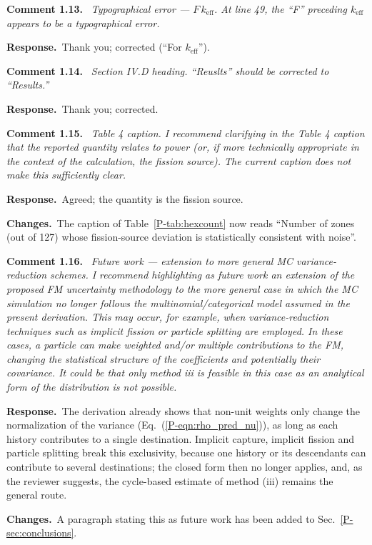 \documentclass[11pt]{article}
\newenvironment{revcomment}[1]
  {\par\medskip\noindent\textbf{Comment #1.}\ \itshape}
  {\par}
\newcommand{\response}{\par\noindent\textbf{Response.}\ }
\newcommand{\changes}{\par\noindent\textbf{Changes.}\ }
\begin{document}
\begin{revcomment}{1.13}
Typographical error --- $F\,k_{\mathrm{eff}}$. At line 49, the ``F'' preceding
$k_{\mathrm{eff}}$ appears to be a typographical error.
\end{revcomment}
\response Thank you; corrected (``For $k_{\text{eff}}$'').

\begin{revcomment}{1.14}
Section IV.D heading. ``Reuslts'' should be corrected to ``Results.''
\end{revcomment}
\response Thank you; corrected.

\begin{revcomment}{1.15}
Table 4 caption. I recommend clarifying in the Table 4 caption that the reported
quantity relates to power (or, if more technically appropriate in the context of the
calculation, the fission source). The current caption does not make this sufficiently
clear.
\end{revcomment}
\response Agreed; the quantity is the fission source.
\changes The caption of Table~\ref{P-tab:hexcount} now reads ``Number of zones (out of 127) whose fission-source deviation is statistically consistent with noise''.

\begin{revcomment}{1.16}
Future work --- extension to more general MC variance-reduction schemes. I recommend
highlighting as future work an extension of the proposed FM uncertainty methodology to
the more general case in which the MC simulation no longer follows the
multinomial/categorical model assumed in the present derivation. This may occur, for
example, when variance-reduction techniques such as implicit fission or particle
splitting are employed. In these cases, a particle can make weighted and/or multiple
contributions to the FM, changing the statistical structure of the coefficients and
potentially their covariance. It could be that only method iii is feasible in this case
as an analytical form of the distribution is not possible.
\end{revcomment}
\response The derivation already shows that non-unit weights only change the normalization of the variance (Eq.~(\ref{P-eqn:rho_pred_nu})), as long as each history contributes to a single destination. Implicit capture, implicit fission and particle splitting break this exclusivity, because one history or its descendants can contribute to several destinations; the closed form then no longer applies, and, as the reviewer suggests, the cycle-based estimate of method (iii) remains the general route.
\changes A paragraph stating this as future work has been added to Sec.~\ref{P-sec:conclusions}.
\end{document}
